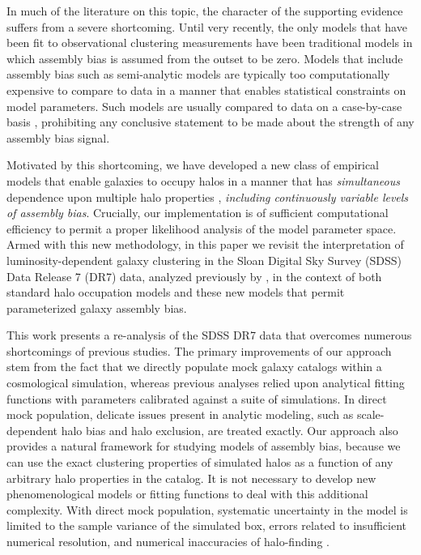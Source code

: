 \documentclass[usenatbib,usegraphicx,letterpaper]{mn2e}
\begin{document}
In much of the literature on this topic,
the character of the supporting evidence
suffers from a severe shortcoming.
Until very recently, the only models that have been fit to
observational clustering measurements have been traditional models
in which assembly bias is assumed from the outset to be zero.
Models that include assembly bias such as semi-analytic models
are typically too computationally expensive to compare to data in a manner 
that enables statistical constraints on model parameters. Such models are usually 
compared to data on a case-by-case basis \citep[e.g.,][]{croton_etal07}, prohibiting
any conclusive statement to be made about the strength of any assembly bias signal.


Motivated by this shortcoming, we have developed a new class of
empirical models that enable galaxies to occupy halos in a manner
that has {\em simultaneous} dependence
upon multiple halo properties \citep{hearin_etal16},
{\em including continuously variable levels of assembly bias}.
Crucially, our implementation is of sufficient computational efficiency
to permit a proper likelihood analysis of the model parameter space.
Armed with this new methodology, in this paper
we revisit the interpretation of luminosity-dependent
galaxy clustering in the Sloan Digital Sky Survey (SDSS) Data Release
7 (DR7) data, analyzed previously by \citet{zehavi_etal11}, in the
context of both standard halo occupation models and these new models 
that permit parameterized galaxy assembly bias.


This work presents a re-analysis of the SDSS DR7 data that
overcomes numerous shortcomings of previous studies.
The primary improvements of our approach stem from the fact that we 
directly populate mock galaxy catalogs within a cosmological simulation,
whereas previous analyses relied upon analytical fitting functions
with parameters calibrated against a suite of simulations. 
In direct mock population, delicate issues present in analytic
modeling, such as scale-dependent halo bias and halo exclusion, 
are treated exactly. 
Our approach also provides a natural framework for studying 
models of assembly bias, because we can use the exact clustering 
properties of simulated halos as a function of
any arbitrary halo properties in the catalog. It is not necessary to develop 
new phenomenological models or fitting functions to deal with this additional 
complexity. With direct mock population, systematic uncertainty in the 
model is limited to the sample variance of the simulated box, errors related 
to insufficient numerical resolution, and numerical inaccuracies of 
halo-finding \citep[e.g., overmerging][]{klypin99a,rockstar}.
\end{document}
